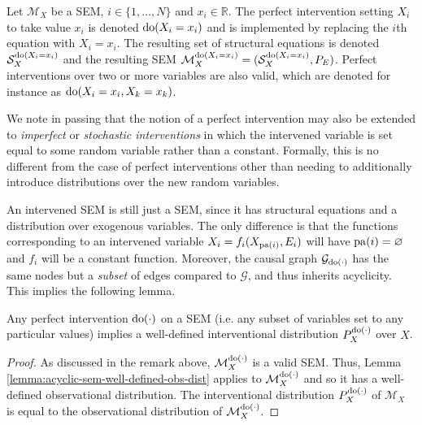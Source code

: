 \medskip

\begin{definition}
	Let $\mathcal{M}_X$ be a SEM, $i \in \{1,\ldots,N \}$ and $x_i \in \mathbb{R}$. The perfect intervention setting $X_i$ to take value $x_i$ is denoted $\operatorname{do}(X_i = x_i)$ and is implemented by replacing the $i$th equation with $X_i = x_i$. The resulting set of structural equations is denoted $\mathcal{S}_X^{\operatorname{do}(X_i=x_i)}$ and the resulting SEM $\mathcal{M}_X^{\operatorname{do}(X_i=x_i)} = (\mathcal{S}_X^{\operatorname{do}(X_i=x_i)}, P_E)$.
	Perfect interventions over two or more variables are also valid, which are denoted for instance as $\operatorname{do}(X_i = x_i, X_k = x_k)$.
\end{definition}


We note in passing that the notion of a perfect intervention may also be extended to \emph{imperfect} or \emph{stochastic interventions} in which the intervened variable is set equal to some random variable rather than a constant. Formally, this is no different from the case of perfect interventions other than needing to additionally introduce distributions over the new random variables. 

An intervened SEM is still just a SEM, since it has structural equations and a distribution over exogenous variables. The only difference is that the functions corresponding to an intervened variable $X_i = f_i(X_{\operatorname{pa}(i)}, E_i)$ will have $\operatorname{pa}(i) = \varnothing$ and $f_i$ will be a constant function. Moreover, the causal graph $\mathcal{G}_{\operatorname{do}(\cdot)}$ has the same nodes but a \emph{subset} of edges compared to $\mathcal{G}$, and thus inherits acyclicity. This implies the following lemma.

\medskip

\begin{lemma}\label{lemma:acyclic-sem-well-defined-int-dist}
	Any perfect intervention $\operatorname{do}(\cdot)$ on a SEM (i.e. any subset of variables set to any particular values) implies a well-defined interventional distribution $P^{\operatorname{do}(\cdot)}_X$ over $X$.
\end{lemma}
\begin{proof}
	As discussed in the remark above, $\mathcal{M}_X^{\operatorname{do}(\cdot)}$ is a valid SEM. Thus, Lemma \ref{lemma:acyclic-sem-well-defined-obs-dist} applies to $\mathcal{M}_X^{\operatorname{do}(\cdot)}$ and so it has a well-defined observational distribution. 
	The interventional distribution $P_X^{\operatorname{do}(\cdot)}$ of $\mathcal{M}_X$ is equal to the observational distribution of $\mathcal{M}_X^{\operatorname{do}(\cdot)}$.
\end{proof}
	
